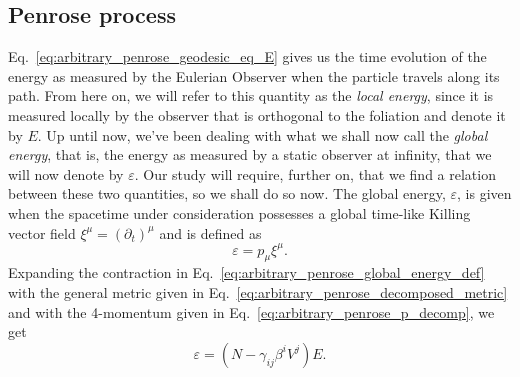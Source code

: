 \subsection{Penrose process}

Eq.~\eqref{eq:arbitrary_penrose_geodesic_eq_E} gives us the time evolution of the energy as measured by the Eulerian Observer when the particle travels along its path. From here on, we will refer to this quantity as the \emph{local energy}, since it is measured locally by the observer that is orthogonal to the foliation and denote it by $E$. Up until now, we've been dealing with what we shall now call the \emph{global energy}, that is, the energy as measured by a static observer at infinity, that we will now denote by $\varepsilon$. Our study will require, further on, that we find a relation between these two quantities, so we shall do so now. The global energy, $\varepsilon$, is given when the spacetime under consideration possesses a global time-like Killing vector field $\xi^\mu = (\partial_t)^\mu$ and is defined as
%
\begin{equation}
  \varepsilon =p_\mu \xi^\mu.
  \label{eq:arbitrary_penrose_global_energy_def}
\end{equation}
%
Expanding the contraction in Eq.~\eqref{eq:arbitrary_penrose_global_energy_def} with the general metric given in Eq.~\eqref{eq:arbitrary_penrose_decomposed_metric} and with the 4-momentum given in Eq.~\eqref{eq:arbitrary_penrose_p_decomp}, we get
%
\begin{equation}
  \varepsilon = \left( N - \gamma_{ij} \beta^i V^j \right) E.
  \label{eq:arbitrary_penrose_local_global_energy_relation}
\end{equation}

